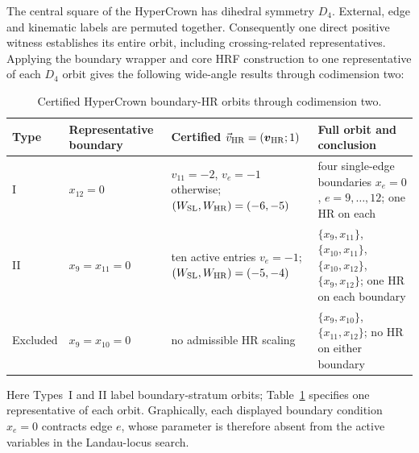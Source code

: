 \documentclass[a4paper,11pt]{article}
\newcommand{\WSL}{W_{\rm SL}}
\newcommand{\WHR}{W_{\rm HR}}
\begin{document}
The central square of the HyperCrown has dihedral symmetry \(D_4\).
External, edge and kinematic
labels are permuted together.  Consequently one direct positive witness
establishes its entire orbit, including crossing-related representatives.
Applying the boundary wrapper and core HRF construction to one representative
of each \(D_4\) orbit gives the following wide-angle results through
codimension two:
\begin{table}[H]
\centering
\small
\begin{tabular}{@{}
 >{\raggedright\arraybackslash}p{}
 >{\raggedright\arraybackslash}p{}
 >{\raggedright\arraybackslash}p{}
 >{\raggedright\arraybackslash}p{}@{}}
\toprule
Type & Representative boundary
& Certified \(\vec v_{\rm HR}=(\boldsymbol v_{\rm HR};1)\)
& Full orbit and conclusion\\
\midrule
I & \(x_{12}=0\)
& \(v_{11}=-2\), \(v_e=-1\) otherwise;
  \((\WSL,\WHR)=(-6,-5)\)
& four single-edge boundaries \(x_e=0\), \(e=9,\ldots,12\);
  one HR on each\\
\addlinespace[2mm]
II & \(x_9=x_{11}=0\)
& ten active entries \(v_e=-1\);
  \((\WSL,\WHR)=(-5,-4)\)
& \(\{x_9,x_{11}\}\), \(\{x_{10},x_{11}\}\),
  \(\{x_{10},x_{12}\}\), \(\{x_9,x_{12}\}\); one HR on each boundary\\
\addlinespace[2mm]
Excluded & \(x_9=x_{10}=0\)
& no admissible HR scaling
& \(\{x_9,x_{10}\}\), \(\{x_{11},x_{12}\}\); no HR on either boundary\\
\bottomrule
\end{tabular}
\caption{Certified HyperCrown boundary-HR orbits through codimension two.}
\label{tab:hypercrown-boundary-orbits}
\end{table}
Here Types~I and II label boundary-stratum orbits;
Table~\ref{tab:hypercrown-boundary-orbits} specifies one
representative of each orbit.  Graphically, each displayed boundary condition
\(x_e=0\) contracts edge \(e\), whose parameter is therefore absent from the
active variables in the Landau-locus search.
\end{document}
